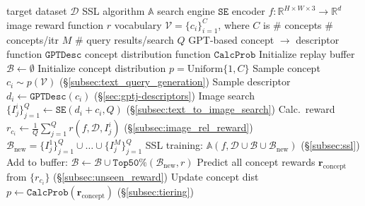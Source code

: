 \begin{algorithm}[t]
   \caption{$\texttt{Internet Explorer}$}
   \label{alg:internet_explorer}
\begin{algorithmic}[1]
    \Statex \quad target dataset $\mathcal D$
    \Statex \quad SSL algorithm $\mathbb{A}$
    \Statex \quad search engine $\texttt{SE}$
    \Statex \quad encoder $f: \mathbb{R}^{H \times W \times 3} \rightarrow \mathbb{R}^d$
    \Statex \quad image reward function $r$
    \Statex \quad vocabulary $\mathcal V = \{c_i\}_{i=1}^C$, where $C$ is $\#$ concepts
    \Statex \quad $\#$ concepts/itr $M$
    \Statex \quad $\#$ query results/search $Q$
    \Statex \quad GPT-based concept $\rightarrow$ descriptor function $\texttt{GPTDesc}$
    \Statex \quad concept distribution function $\texttt{CalcProb}$
    \State Initialize replay buffer $\mathcal{B} \leftarrow \emptyset$
    \State Initialize concept distribution $p = \text{Uniform}\{1, C\}$
            \State Sample concept $c_i \sim p(\mathcal{V})$ \hfill (\S\ref{subsec:text_query_generation})
            \State Sample descriptor $d_i \gets \texttt{GPTDesc}(c_i)$ \hfill (\S\ref{sec:gptj-descriptors})
            \State Image search $\{I_j^i\}_{j=1}^Q  \leftarrow \texttt{SE}(d_i + c_i, Q)$ \hfill (\S\ref{subsec:text_to_image_search})
            \State Calc.\ reward $r_{c_i} \gets \frac 1 Q \sum_{j=1}^Q r(f, \mathcal D, I_j^i)$ \hfill (\S\ref{subsec:image_rel_reward})
        \EndFor
        \State $\mathcal B_{\text{new}} = \{I_j^1\}_{j=1}^Q \cup \dots \cup \{I_j^M\}_{j=1}^Q$
        \State SSL training: $\mathbb{A}(f, \mathcal D \cup \mathcal B \cup \mathcal B_{\text{new}})$ \hfill (\S\ref{subsec:ssl})
        \State Add to buffer: $\mathcal{B} \leftarrow \mathcal{B} \cup \texttt{Top50\%}(\mathcal B_{\text{new}}, r)$  %
        \State Predict all concept rewards $\mathbf{r}_{\text{concept}}$ from $\{r_{c_i}\}$ \hfill (\S\ref{subsec:unseen_reward})
        \State Update concept dist $p \leftarrow \texttt{CalcProb}(\mathbf{r}_{\text{concept}})$ \hfill (\S\ref{subsec:tiering})
    \EndFor
\end{algorithmic}
\end{algorithm}

